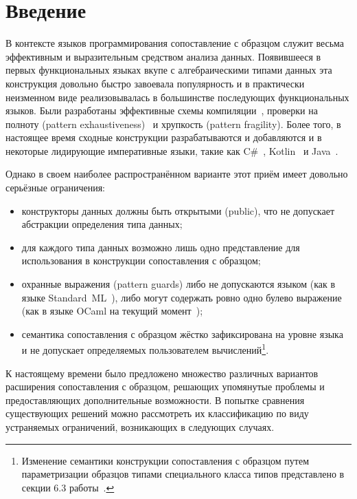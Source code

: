 \section*{Введение}
В контексте языков программирования сопоставление с образцом служит весьма эффективным и выразительным средством анализа данных. Появившееся в первых функциональных языках вкупе с алгебраическими типами данных эта конструкция довольно быстро завоевала популярность и в практически неизменном виде реализовывалась в большинстве последующих функциональных языков. Были разработаны эффективные схемы компиляции~\cite{fessant2001optimizing, maranget2008decisiontrees, scott2000whendo}, проверки на полноту (pattern exhaus\-ti\-ve\-ness)~\cite{maranget2007warnings} и хрупкость (pattern fragility). Более того, в настоящее время сходные конструкции разрабатываются и добавляются и в некоторые лидирующие императивные языки, такие как C\#~\cite{csharp2019pattern_matching}, Kotlin~\cite{kotlin2019when_expression} и Java~\cite{java2019proposal}. 

Однако в своем наиболее распространённом варианте этот приём имеет довольно серьёзные ограничения: 

\begin{itemize}
  \item конструкторы данных должны быть открытыми (public), что не допускает абстракции определения типа данных; 
  \item для каждого типа данных возможно лишь одно представление для использования в конструкции сопоставления с образцом; 
  \item охранные выражения (pattern guards) либо не допускаются языком (как в языке Standard~ML~\cite{milner1997definition}), либо могут содержать ровно одно булево выражение (как в языке OCaml на текущий момент~\cite{leroy2019manual});
  \item семантика сопоставления с образцом жёстко зафиксирована на уровне языка и не допускает определяемых пользователем вычислений\footnote{Изменение семантики конструкции сопоставления с образцом путем параметризации образцов типами специального класса типов представлено в секции 6.3 работы~\cite{syme2007extensible}.}.
\end{itemize}

К настоящему времени было предложено множество различных вариантов расширения сопоставления с образцом, решающих упомянутые проблемы и предоставляющих дополнительные возможности. В попытке сравнения существующих решений можно рассмотреть их классификацию по виду устраняемых ограничений, возникающих в следующих случаях. 

